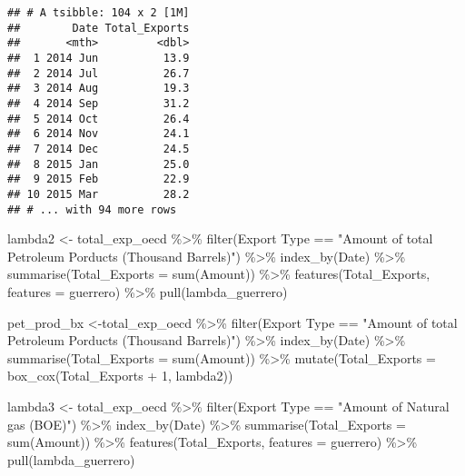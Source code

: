 \documentclass[
]{article}
\newenvironment{Shaded}{\begin{snugshade}}{\end{snugshade}}
\newcommand{\AttributeTok}[1]{\textcolor[rgb]{0.77,0.63,0.00}{#1}}
\newcommand{\DecValTok}[1]{\textcolor[rgb]{0.00,0.00,0.81}{#1}}
\newcommand{\FunctionTok}[1]{\textcolor[rgb]{0.00,0.00,0.00}{#1}}
\newcommand{\NormalTok}[1]{#1}
\newcommand{\OtherTok}[1]{\textcolor[rgb]{0.56,0.35,0.01}{#1}}
\newcommand{\SpecialCharTok}[1]{\textcolor[rgb]{0.00,0.00,0.00}{#1}}
\newcommand{\StringTok}[1]{\textcolor[rgb]{0.31,0.60,0.02}{#1}}
\begin{document}
\begin{verbatim}
## # A tsibble: 104 x 2 [1M]
##        Date Total_Exports
##       <mth>         <dbl>
##  1 2014 Jun          13.9
##  2 2014 Jul          26.7
##  3 2014 Aug          19.3
##  4 2014 Sep          31.2
##  5 2014 Oct          26.4
##  6 2014 Nov          24.1
##  7 2014 Dec          24.5
##  8 2015 Jan          25.0
##  9 2015 Feb          22.9
## 10 2015 Mar          28.2
## # ... with 94 more rows
\end{verbatim}

\begin{Shaded}
\begin{Highlighting}[]
\NormalTok{lambda2 }\OtherTok{\textless{}{-}}\NormalTok{ total\_exp\_oecd }\SpecialCharTok{\%\textgreater{}\%} 
  \FunctionTok{filter}\NormalTok{(}\StringTok{\textasciigrave{}}\AttributeTok{Export Type}\StringTok{\textasciigrave{}} \SpecialCharTok{==} \StringTok{"Amount of total Petroleum Porducts (Thousand Barrels)"}\NormalTok{) }\SpecialCharTok{\%\textgreater{}\%} 
  \FunctionTok{index\_by}\NormalTok{(Date) }\SpecialCharTok{\%\textgreater{}\%} 
  \FunctionTok{summarise}\NormalTok{(}\AttributeTok{Total\_Exports =} \FunctionTok{sum}\NormalTok{(Amount)) }\SpecialCharTok{\%\textgreater{}\%} 
  \FunctionTok{features}\NormalTok{(Total\_Exports, }\AttributeTok{features =}\NormalTok{ guerrero) }\SpecialCharTok{\%\textgreater{}\%} 
  \FunctionTok{pull}\NormalTok{(lambda\_guerrero)}

\NormalTok{pet\_prod\_bx }\OtherTok{\textless{}{-}}\NormalTok{total\_exp\_oecd }\SpecialCharTok{\%\textgreater{}\%} 
  \FunctionTok{filter}\NormalTok{(}\StringTok{\textasciigrave{}}\AttributeTok{Export Type}\StringTok{\textasciigrave{}} \SpecialCharTok{==} \StringTok{"Amount of total Petroleum Porducts (Thousand Barrels)"}\NormalTok{) }\SpecialCharTok{\%\textgreater{}\%} 
  \FunctionTok{index\_by}\NormalTok{(Date) }\SpecialCharTok{\%\textgreater{}\%} 
  \FunctionTok{summarise}\NormalTok{(}\AttributeTok{Total\_Exports =} \FunctionTok{sum}\NormalTok{(Amount)) }\SpecialCharTok{\%\textgreater{}\%} 
  \FunctionTok{mutate}\NormalTok{(}\AttributeTok{Total\_Exports =} \FunctionTok{box\_cox}\NormalTok{(Total\_Exports }\SpecialCharTok{+} \DecValTok{1}\NormalTok{, lambda2))}

\NormalTok{lambda3 }\OtherTok{\textless{}{-}}\NormalTok{ total\_exp\_oecd }\SpecialCharTok{\%\textgreater{}\%} 
  \FunctionTok{filter}\NormalTok{(}\StringTok{\textasciigrave{}}\AttributeTok{Export Type}\StringTok{\textasciigrave{}} \SpecialCharTok{==} \StringTok{"Amount of Natural gas (BOE)"}\NormalTok{) }\SpecialCharTok{\%\textgreater{}\%} 
  \FunctionTok{index\_by}\NormalTok{(Date) }\SpecialCharTok{\%\textgreater{}\%} 
  \FunctionTok{summarise}\NormalTok{(}\AttributeTok{Total\_Exports =} \FunctionTok{sum}\NormalTok{(Amount)) }\SpecialCharTok{\%\textgreater{}\%} 
  \FunctionTok{features}\NormalTok{(Total\_Exports, }\AttributeTok{features =}\NormalTok{ guerrero) }\SpecialCharTok{\%\textgreater{}\%} 
  \FunctionTok{pull}\NormalTok{(lambda\_guerrero)}


\end{Highlighting}
\end{Shaded}
\end{document}
